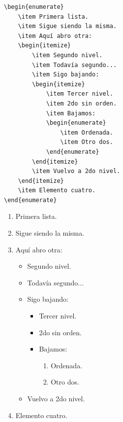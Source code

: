 \lstruleb\vspace{-5mm}
\begin{multicols}{2}
\begin{lstlisting}[style=latex,frame={}]
\begin{enumerate}
	\item Primera lista.
	\item Sigue siendo la misma.
	\item Aquí abro otra:
	\begin{itemize}
		\item Segundo nivel.
		\item Todavía segundo...
		\item Sigo bajando:
		\begin{itemize}
			\item Tercer nivel.
			\item 2do sin orden.
			\item Bajamos:
			\begin{enumerate}
				\item Ordenada.
				\item Otro dos.
			\end{enumerate}
		\end{itemize}
		\item Vuelvo a 2do nivel.
	\end{itemize}
	\item Elemento cuatro.
\end{enumerate}
\end{lstlisting}

\columnbreak
\begin{enumerate}
	\item Primera lista.
	\item Sigue siendo la misma.
	\item Aquí abro otra:
	\begin{itemize}
		\item Segundo nivel.
		\item Todavía segundo...
		\item Sigo bajando:
		\begin{itemize}
			\item Tercer nivel.
			\item 2do sin orden.
			\item Bajamos:
			\begin{enumerate}
				\item Ordenada.
				\item Otro dos.
			\end{enumerate}
		\end{itemize}
		\item Vuelvo a 2do nivel.
	\end{itemize}
	\item Elemento cuatro.
\end{enumerate}
\end{multicols}
\vspace{-7mm}\lstruleb

